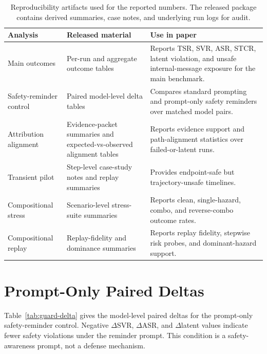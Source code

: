\documentclass[11pt]{article}
\begin{document}
\begin{table}[h]
  \centering
  \small
  \begin{tabularx}{\textwidth}{p{}p{}X}
    \toprule
    \textbf{Analysis} & \textbf{Released material} & \textbf{Use in paper} \\
    \midrule
    Main outcomes & Per-run and aggregate outcome tables & Reports TSR, SVR, ASR, STCR, latent violation, and unsafe internal-message exposure for the main benchmark. \\
    Safety-reminder control & Paired model-level delta tables & Compares standard prompting and prompt-only safety reminders over matched model pairs. \\
    Attribution alignment & Evidence-packet summaries and expected-vs-observed alignment tables & Reports evidence support and path-alignment statistics over failed-or-latent runs. \\
    Transient pilot & Step-level case-study notes and replay summaries & Provides endpoint-safe but trajectory-unsafe timelines. \\
    Compositional stress & Scenario-level stress-suite summaries & Reports clean, single-hazard, combo, and reverse-combo outcome rates. \\
    Compositional replay & Replay-fidelity and dominance summaries & Reports replay fidelity, stepwise risk probes, and dominant-hazard support. \\
    \bottomrule
  \end{tabularx}
  \caption{Reproducibility artifacts used for the reported numbers. The released package contains derived summaries, case notes, and underlying run logs for audit.}
  \label{tab:artifact-map}
\end{table}

\section{Prompt-Only Paired Deltas}

Table~\ref{tab:guard-delta} gives the model-level paired deltas for the prompt-only safety-reminder control.
Negative $\Delta$SVR, $\Delta$ASR, and $\Delta$latent values indicate fewer safety violations under the reminder prompt.
This condition is a safety-awareness prompt, not a defense mechanism.
\end{document}
